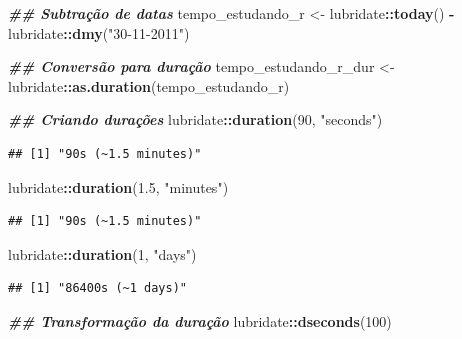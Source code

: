 \documentclass[
]{article}
\newenvironment{Shaded}{\begin{snugshade}}{\end{snugshade}}
\newcommand{\DecValTok}[1]{\textcolor[rgb]{0.00,0.00,0.81}{#1}}
\newcommand{\DocumentationTok}[1]{\textcolor[rgb]{0.56,0.35,0.01}{\textbf{\textit{#1}}}}
\newcommand{\FloatTok}[1]{\textcolor[rgb]{0.00,0.00,0.81}{#1}}
\newcommand{\FunctionTok}[1]{\textcolor[rgb]{0.13,0.29,0.53}{\textbf{#1}}}
\newcommand{\NormalTok}[1]{#1}
\newcommand{\OtherTok}[1]{\textcolor[rgb]{0.56,0.35,0.01}{#1}}
\newcommand{\SpecialCharTok}[1]{\textcolor[rgb]{0.81,0.36,0.00}{\textbf{#1}}}
\newcommand{\StringTok}[1]{\textcolor[rgb]{0.31,0.60,0.02}{#1}}
\begin{document}
\begin{Shaded}
\begin{Highlighting}[]
\DocumentationTok{\#\# Subtração de datas}
\NormalTok{tempo\_estudando\_r }\OtherTok{\textless{}{-}}\NormalTok{ lubridate}\SpecialCharTok{::}\FunctionTok{today}\NormalTok{() }\SpecialCharTok{{-}}\NormalTok{ lubridate}\SpecialCharTok{::}\FunctionTok{dmy}\NormalTok{(}\StringTok{"30{-}11{-}2011"}\NormalTok{)}

\DocumentationTok{\#\# Conversão para duração}
\NormalTok{tempo\_estudando\_r\_dur }\OtherTok{\textless{}{-}}\NormalTok{ lubridate}\SpecialCharTok{::}\FunctionTok{as.duration}\NormalTok{(tempo\_estudando\_r)}

\DocumentationTok{\#\# Criando durações}
\NormalTok{lubridate}\SpecialCharTok{::}\FunctionTok{duration}\NormalTok{(}\DecValTok{90}\NormalTok{, }\StringTok{"seconds"}\NormalTok{)}
\end{Highlighting}
\end{Shaded}

\begin{verbatim}
## [1] "90s (~1.5 minutes)"
\end{verbatim}

\begin{Shaded}
\begin{Highlighting}[]
\NormalTok{lubridate}\SpecialCharTok{::}\FunctionTok{duration}\NormalTok{(}\FloatTok{1.5}\NormalTok{, }\StringTok{"minutes"}\NormalTok{)}
\end{Highlighting}
\end{Shaded}

\begin{verbatim}
## [1] "90s (~1.5 minutes)"
\end{verbatim}

\begin{Shaded}
\begin{Highlighting}[]
\NormalTok{lubridate}\SpecialCharTok{::}\FunctionTok{duration}\NormalTok{(}\DecValTok{1}\NormalTok{, }\StringTok{"days"}\NormalTok{)}
\end{Highlighting}
\end{Shaded}

\begin{verbatim}
## [1] "86400s (~1 days)"
\end{verbatim}

\begin{Shaded}
\begin{Highlighting}[]
\DocumentationTok{\#\# Transformação da duração}
\NormalTok{lubridate}\SpecialCharTok{::}\FunctionTok{dseconds}\NormalTok{(}\DecValTok{100}\NormalTok{)}
\end{Highlighting}
\end{Shaded}
\end{document}
